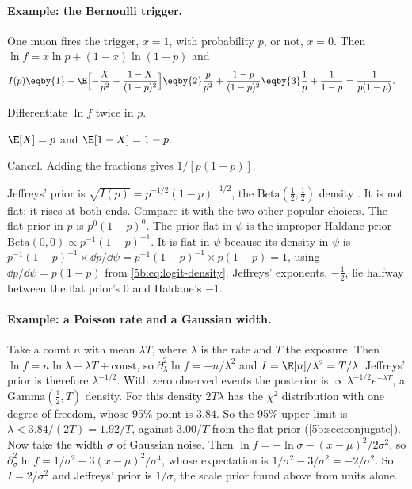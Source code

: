 \paragraph{Example: the Bernoulli trigger.} One muon fires the trigger, $x=1$, with
probability $p$, or not, $x=0$. Then $\ln f=x\ln p+(1-x)\ln(1-p)$ and
\begin{align*}
  I(p)
  &\eqby{1}-\E\Bigl[-\frac{X}{p^2}-\frac{1-X}{(1-p)^2}\Bigr]
   \eqby{2}\frac{p}{p^2}+\frac{1-p}{(1-p)^2}
   \eqby{3}\frac1p+\frac1{1-p}
   =\frac{1}{p(1-p)} .
\end{align*}
\begin{explain}
  \item Differentiate $\ln f$ twice in $p$.
  \item $\E[X]=p$ and $\E[1-X]=1-p$.
  \item Cancel. Adding the fractions gives $1/[p(1-p)]$.
\end{explain}
Jeffreys' prior is $\sqrt{I(p)}=p^{-1/2}(1-p)^{-1/2}$, the
$\mathrm{Beta}(\tfrac12,\tfrac12)$ density . It is not flat;
it rises at both ends. Compare it with the two other popular choices. The flat prior in
$p$ is $p^0(1-p)^0$. The prior flat in $\psi$ is the improper Haldane prior
$\mathrm{Beta}(0,0)\propto p^{-1}(1-p)^{-1}$. It is flat in $\psi$ because its density
in $\psi$ is $p^{-1}(1-p)^{-1}\times\dd p/\dd\psi=p^{-1}(1-p)^{-1}\times p(1-p)=1$, using
$\dd p/\dd\psi=p(1-p)$ from \eqref{5b:eq:logit-density}. Jeffreys' exponents,
$-\tfrac12$, lie halfway between the flat prior's $0$ and Haldane's $-1$.

\paragraph{Example: a Poisson rate and a Gaussian width.} Take a count $n$ with mean
$\lambda T$, where $\lambda$ is the rate and $T$ the exposure. Then $\ln f=n\ln\lambda-
\lambda T+\text{const}$, so $\partial_\lambda^2\ln f=-n/\lambda^2$ and
$I=\E[n]/\lambda^2=T/\lambda$. Jeffreys' prior is therefore $\lambda^{-1/2}$. With zero
observed events the posterior is $\propto\lambda^{-1/2}e^{-\lambda T}$, a
$\mathrm{Gamma}(\tfrac12,T)$ density. For this density $2T\lambda$ has the $\chi^2$
distribution with one degree of freedom, whose 95\% point is $3.84$. So the 95\% upper
limit is $\lambda<3.84/(2T)=1.92/T$, against $3.00/T$ from the flat prior
(\cref{5b:sec:conjugate}). Now take the width $\sigma$ of Gaussian noise. Then $\ln f=-\ln\sigma-(x-\mu)^2/2\sigma^2$, so
$\partial_\sigma^2\ln f=1/\sigma^2-3(x-\mu)^2/\sigma^4$, whose expectation is
$1/\sigma^2-3/\sigma^2=-2/\sigma^2$. So $I=2/\sigma^2$ and Jeffreys' prior is
$1/\sigma$, the scale prior found above from units alone.

